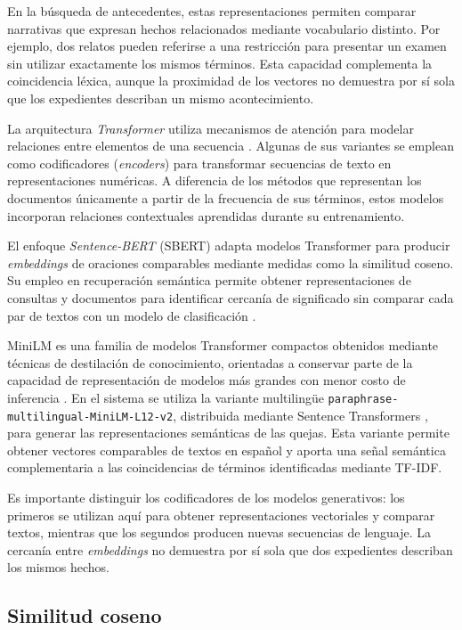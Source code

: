 En la búsqueda de antecedentes, estas representaciones permiten comparar narrativas que expresan hechos relacionados mediante vocabulario distinto. Por ejemplo, dos relatos pueden referirse a una restricción para presentar un examen sin utilizar exactamente los mismos términos. Esta capacidad complementa la coincidencia léxica, aunque la proximidad de los vectores no demuestra por sí sola que los expedientes describan un mismo acontecimiento.

La arquitectura \textit{Transformer} utiliza mecanismos de atención para modelar relaciones entre elementos de una secuencia \cite{vaswani2017attention}. Algunas de sus variantes se emplean como codificadores
(\textit{encoders}) para transformar secuencias de texto en representaciones numéricas. A diferencia
de los métodos que representan los documentos únicamente a partir de la frecuencia de sus términos, estos modelos incorporan relaciones contextuales aprendidas durante su entrenamiento.

El enfoque \textit{Sentence-BERT} (SBERT) adapta modelos Transformer para producir
\textit{embeddings} de oraciones comparables mediante medidas como la similitud coseno. Su empleo
en recuperación semántica permite obtener representaciones de consultas y documentos para identificar cercanía de significado sin comparar cada par de textos con un modelo de clasificación
\cite{reimers2019sbert}.

MiniLM es una familia de modelos Transformer compactos obtenidos mediante técnicas de destilación de conocimiento, orientadas a conservar parte de la capacidad de representación de modelos más grandes con menor costo de inferencia \cite{wang2020minilm}. En el sistema se utiliza la variante multilingüe \texttt{paraphrase-multilingual-MiniLM-L12-v2}, distribuida mediante Sentence Transformers \cite{hf_minilm_multilingual}, para generar las representaciones semánticas de las quejas. Esta variante permite obtener vectores comparables de textos en español y aporta una señal semántica complementaria a las coincidencias de términos identificadas mediante TF-IDF.

Es importante distinguir los codificadores de los modelos generativos: los primeros se utilizan aquí para obtener representaciones vectoriales y comparar textos, mientras que los segundos producen nuevas secuencias de lenguaje. La cercanía entre \textit{embeddings} no demuestra por sí sola que dos expedientes describan los mismos hechos.

\subsection{Similitud coseno}

